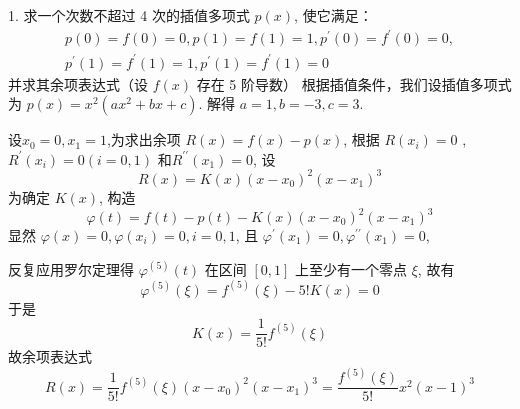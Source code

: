 \begin{tcolorbox}[breakable,
		colframe=white!10!jingga, coltitle=white!90!jingga, colback=white!95!jingga, coltext=black, colbacktitle=white!10!jingga, enhanced, fonttitle=\bfseries,fontupper=\normalsize, attach boxed title to top left={yshift=-2mm}, before skip=8pt, after skip=8pt,
		title=解答题]

1. 求一个次数不超过 4 次的插值多项式 $ p(x) $, 使它满足：
$$
\begin{array}{l}
p(0)=f(0)=0, p(1)=f(1)=1, p^{\prime}(0)=f^{\prime}(0)=0, \\
p^{\prime}(1)=f^{\prime}(1)=1, p^{\prime}(1)=f^{\prime}(1)=0
\end{array}
$$
并求其余项表达式（设 $ f(x) $ 存在 5 阶导数）
\tcblower
根据插值条件，我们设插值多项式为 $ p(x)=x^{2}(ax^{2}+bx+c) $. 解得 $ a=1, b=-3, c=3 $.

设$x_0=0,x_1=1$,为求出余项 $ R(x)=f(x)-p(x) $, 根据 $ R\left(x_{i}\right)=0 $ , $R^{\prime}\left(x_{i}\right)=0(i=0,1) $ 和$R^{\prime\prime}\left(x_{1}\right)=0 $, 设
$$
R(x)=K(x)\left(x-x_{0}\right)^2\left(x-x_{1}\right)^{3}
$$
为确定 $ K(x) $, 构造
$$
\varphi(t)=f(t)-p(t)-K(x)\left(x-x_{0}\right)^2\left(x-x_{1}\right)^{3}
$$
显然 $\varphi(x)=0, \varphi\left(x_{i}\right)=0, i=0,1 $, 且 $\varphi^{\prime}\left(x_{1}\right)=0,\varphi^{\prime\prime}\left(x_{1}\right)=0 $, 

反复应用罗尔定理得 $ \varphi^{(5)}(t) $ 在区间 $ [0, 1] $ 上至少有一个零点 $ \xi $, 故有
$$
\varphi^{(5)}(\xi)=f^{(5)}(\xi)-5 ! K(x)=0
$$
于是
$$
K(x)=\frac{1}{5 !} f^{(5)}(\xi)
$$
故余项表达式
$$
R(x)=\frac{1}{5 !} f^{(5)}(\xi)\left(x-x_{0}\right)^2\left(x-x_{1}\right)^{3}=\frac{f^{(5)}(\xi)}{5!}x^{2}(x-1)^{3}
$$

\end{tcolorbox}




